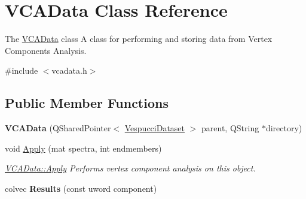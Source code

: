 \hypertarget{class_v_c_a_data}{\section{V\+C\+A\+Data Class Reference}
\label{class_v_c_a_data}
}


The \hyperlink{class_v_c_a_data}{V\+C\+A\+Data} class A class for performing and storing data from Vertex Components Analysis.  




{\ttfamily \#include $<$vcadata.\+h$>$}

\subsection*{Public Member Functions}
\begin{DoxyCompactItemize}
\item 
\hypertarget{class_v_c_a_data_a9578c4abae0fc9a3465fb9c4f3650894}{{\bfseries V\+C\+A\+Data} (Q\+Shared\+Pointer$<$ \hyperlink{class_vespucci_dataset}{Vespucci\+Dataset} $>$ parent, Q\+String $\ast$directory)}\label{class_v_c_a_data_a9578c4abae0fc9a3465fb9c4f3650894}

\item 
void \hyperlink{class_v_c_a_data_a179153e31b69399bd92ade553c9eef05}{Apply} (mat spectra, int endmembers)
\begin{DoxyCompactList}\small\item\em \hyperlink{class_v_c_a_data_a179153e31b69399bd92ade553c9eef05}{V\+C\+A\+Data\+::\+Apply} Performs vertex component analysis on this object. \end{DoxyCompactList}\item 
\hypertarget{class_v_c_a_data_a552d50bce4b370fda6814fc9386b461c}{colvec {\bfseries Results} (const uword component)}\label{class_v_c_a_data_a552d50bce4b370fda6814fc9386b461c}


\end{DoxyCompactItemize}
